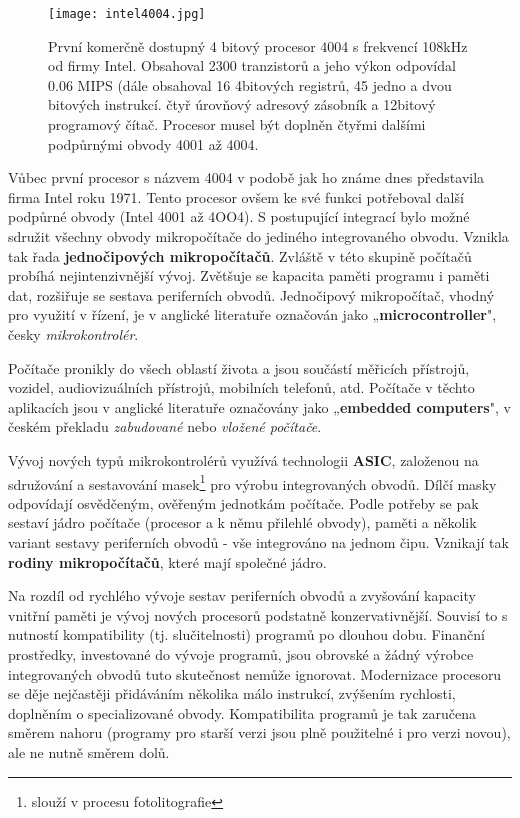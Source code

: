     \begin{figure}[ht!] %
      \centering
      \texttt{[image: intel4004.jpg]}
      \caption{ První komerčně dostupný 4 bitový procesor 4004 s frekvencí 108kHz od firmy Intel. 
                Obsahoval 2300 tranzistorů a jeho výkon odpovídal 0.06 MIPS (dále obsahoval 16 4bitových 
                registrů, 45 jedno a dvou bitových instrukcí. čtyř úrovňový adresový zásobník a 12bitový 
                programový čítač. Procesor musel být doplněn čtyřmi dalšími podpůrnými obvody 4001 až 4004.}
      \label{MIT:fig_intel4004}
    \end{figure}
    
    Vůbec první procesor s názvem 4004 v podobě jak ho známe dnes představila firma Intel roku 1971. Tento 
    procesor ovšem ke své funkci potřeboval další podpůrné obvody (Intel 4001 až 4OO4). S postupující 
    integrací bylo možné sdružit všechny obvody mikropočítače do jediného integrovaného obvodu. Vznikla tak 
    řada \textbf{jednočipových mikropočítačů}. Zvláště v této skupině počítačů probíhá nejintenzivnější 
    vývoj. Zvětšuje se kapacita paměti programu i paměti dat, rozšiřuje se sestava periferních obvodů. 
    Jednočipový mikropočítač, vhodný pro využití v řízení, je v anglické literatuře označován jako 
    „\textbf{microcontroller}", česky \emph{mikrokontrolér}.
    
    Počítače pronikly do všech oblastí života a jsou součástí měřicích přístrojů, vozidel, audiovizuálních 
    přístrojů, mobilních telefonů, atd. Počítače v těchto aplikacích jsou v anglické literatuře označovány 
    jako „\textbf{embedded computers}", v českém překladu \emph{zabudované} nebo \emph{vložené počítače}.
    
    Vývoj nových typů mikrokontrolérů využívá technologii \textbf{ASIC}, založenou na sdružování a 
    sestavování masek\footnote{slouží v procesu fotolitografie} pro výrobu integrovaných obvodů. Dílčí masky 
    odpovídají osvědčeným, ověřeným jednotkám počítače. Podle potřeby se pak sestaví jádro počítače (procesor 
    a k němu přilehlé obvody), paměti a několik variant sestavy periferních obvodů - vše integrováno na 
    jednom čipu. Vznikají tak \textbf{rodiny mikropočítačů}, které mají společné jádro.
    
    Na rozdíl od rychlého vývoje sestav periferních obvodů a zvyšování kapacity vnitřní paměti je vývoj 
    nových procesorů podstatně konzervativnější. Souvisí to s nutností kompatibility (tj. slučitelnosti) 
    programů po dlouhou dobu. Finanční prostředky, investované do vývoje programů, jsou obrovské a žádný 
    výrobce integrovaných obvodů tuto skutečnost nemůže ignorovat. Modernizace procesoru se děje nejčastěji 
    přidáváním několika málo instrukcí, zvýšením rychlosti, doplněním o specializované obvody. Kompatibilita 
    programů je tak zaručena směrem nahoru (programy pro starší verzi jsou plně použitelné i pro verzi 
    novou), ale ne nutně směrem dolů.
    

